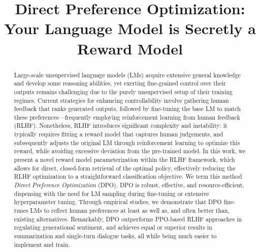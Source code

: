 \title{Direct Preference Optimization: Your Language Model is Secretly a Reward Model}

\begin{abstract}
Large-scale unsupervised language models (LMs) acquire extensive general knowledge and develop some reasoning abilities, yet exerting fine-grained control over their outputs remains challenging due to the purely unsupervised setup of their training regimes. Current strategies for enhancing controllability involve gathering human feedback that ranks generated outputs, followed by fine-tuning the base LM to match these preferences—frequently employing reinforcement learning from human feedback (RLHF). Nonetheless, RLHF introduces significant complexity and instability: it typically requires fitting a reward model that captures human judgements, and subsequently adjusts the original LM through reinforcement learning to optimize this reward, while avoiding excessive deviation from the pre-trained model. In this work, we present a novel reward model parameterization within the RLHF framework, which allows for direct, closed-form retrieval of the optimal policy, effectively reducing the RLHF optimization to a straightforward classification objective. We term this method \textit{Direct Preference Optimization} (DPO). DPO is robust, effective, and resource-efficient, dispensing with the need for LM sampling during fine-tuning or extensive hyperparameter tuning. Through empirical studies, we demonstrate that DPO fine-tunes LMs to reflect human preferences at least as well as, and often better than, existing alternatives. Remarkably, DPO outperforms PPO-based RLHF approaches in regulating generational sentiment, and achieves equal or superior results in summarization and single-turn dialogue tasks, all while being much easier to implement and train.
\end{abstract}

